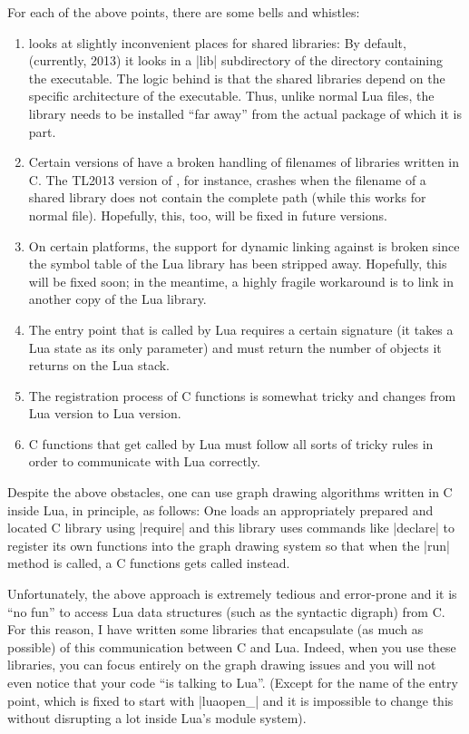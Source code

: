 For each of the above points, there are some bells and whistles:
%
\begin{enumerate}
    \item {} looks at slightly inconvenient places for shared libraries:
        By default, (currently, 2013) it looks in a |lib| subdirectory of the
        directory containing the  executable. The logic behind is that
        the shared libraries depend on the specific architecture of the
        executable. Thus, unlike normal Lua files, the library needs to be
        installed ``far away'' from the actual package of which it is part.
    \item Certain versions of  have a broken handling of filenames of
        libraries written in C. The TL2013 version of , for instance,
        crashes when the filename of a shared library does not contain the
        complete path (while this works for normal file). Hopefully, this, too,
        will be fixed in future versions.
    \item On certain platforms, the support for dynamic linking against
         is broken since the symbol table of the Lua library has been
        stripped away. Hopefully, this will be fixed soon; in the meantime, a
        highly fragile workaround is to link in another copy of the Lua
        library.
    \item The entry point that is called by Lua requires a certain signature
        (it takes a Lua state as its only parameter) and must return the number
        of objects it returns on the Lua stack.
    \item The registration process of C functions is somewhat tricky and
        changes from Lua version to Lua version.
    \item C functions that get called by Lua must follow all sorts of tricky
        rules in order to communicate with Lua correctly.
\end{enumerate}

Despite the above obstacles, one can use graph drawing algorithms written in C
inside Lua, in principle, as follows: One loads an appropriately prepared and
located C library using |require| and this library uses commands like |declare|
to register its own functions into the graph drawing system so that when the
|run| method is called, a C functions gets called instead.

Unfortunately, the above approach is extremely tedious and error-prone and it
is ``no fun'' to access Lua data structures (such as the syntactic digraph)
from C. For this reason, I have written some libraries that encapsulate (as
much as possible) of this communication between C and Lua. Indeed, when you use
these libraries, you can focus entirely on the graph drawing issues and you
will not even notice that your code ``is talking to Lua''. (Except for the name
of the entry point, which is fixed to start with |luaopen_| and it is
impossible to change this without disrupting a lot inside Lua's module system).

